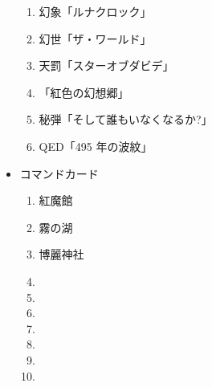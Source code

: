 \documentclass[line_length=22zw,number_of_lines=45,twocolumn]{jlreq}
\begin{document}
\begin{itemize}
\begin{enumerate}
			\item 幻象「ルナクロック」
			\item 幻世「ザ・ワールド」
			\item 天罰「スターオブダビデ」
			\item 「紅色の幻想郷」
			\item 秘弾「そして誰もいなくなるか?」
			\item QED「495 年の波紋」
		\end{enumerate}
	\item コマンドカード
		\begin{enumerate}
			\item 紅魔館
			\item 霧の湖
			\item 博麗神社
			\item 
			\item 
			\item 
			\item 
			\item 
			\item 
			\item 
		\end{enumerate}
\end{itemize}
\pagebreak
\end{document}
